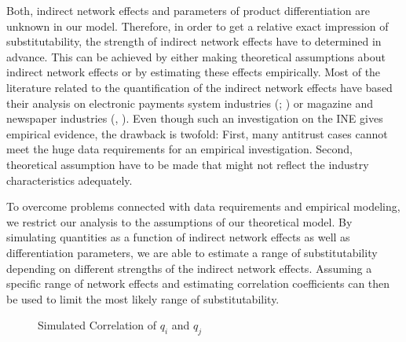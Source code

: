 \documentclass[12pt,a4paper]{scrreprt}
\begin{document}
Both, indirect network effects and parameters of product differentiation are unknown in our model. Therefore, in order to get a relative exact impression of substitutability, the strength of indirect network effects have to determined in advance. This can be achieved by either making theoretical assumptions about indirect network effects or by estimating these effects empirically. Most of the literature related to the quantification of the indirect network effects have based their analysis on electronic payments system industries (\cite{ackerberg_quantifying_2006}; \cite{rysman_empirical_2007}) or magazine and newspaper industries (\cite{kaiser_price_2006}, \cite{argentesi_estimating_2007}). Even though such an investigation on the INE gives empirical evidence, the drawback is twofold: First, many antitrust cases cannot meet the huge data requirements for an empirical investigation. Second, theoretical assumption have to be made that might not reflect the industry characteristics adequately. 

To overcome problems connected with data requirements and empirical modeling, we restrict our analysis to the assumptions of our theoretical model. By simulating quantities as a function of indirect network effects as well as differentiation parameters, we are able to estimate a range of substitutability depending on different strengths of the indirect network effects. Assuming a specific range of network effects and estimating correlation coefficients can then be used to limit the most likely range of substitutability.  



\begin{figure}[H]
	\centering
	\caption{Simulated Correlation of $q_i$ and $q_j$}
	\begin{adjustbox}{width=\textwidth}	
	
	\label{fig_QQ}
\end{adjustbox}
\end{figure}
\end{document}

